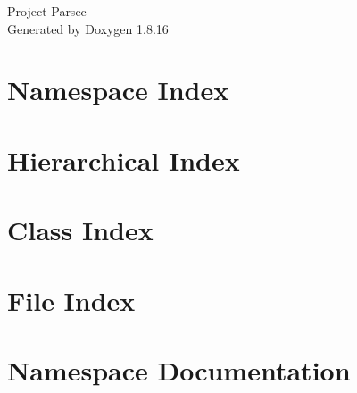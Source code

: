 \let\mypdfximage\pdfximage\def\pdfximage{\immediate\mypdfximage}\documentclass[twoside]{book}
\newcommand{\+}{\discretionary{\mbox{\scriptsize$\hookleftarrow$}}{}{}}
\newcommand{\clearemptydoublepage}{%
  \newpage{\pagestyle{empty}\cleardoublepage}%
}
\begin{document}
\hypersetup{pageanchor=false,
             bookmarksnumbered=true,
             pdfencoding=unicode
            }
\begin{titlepage}
\vspace*{7cm}
\begin{center}%
{\Large Project Parsec }\\
\vspace*{1cm}
{\large Generated by Doxygen 1.8.16}\\
\end{center}
\end{titlepage}
\clearemptydoublepage
{}
\tableofcontents
\clearemptydoublepage
{}
\hypersetup{pageanchor=true}

\chapter{Namespace Index}

\chapter{Hierarchical Index}

\chapter{Class Index}

\chapter{File Index}

\chapter{Namespace Documentation}







\end{document}
